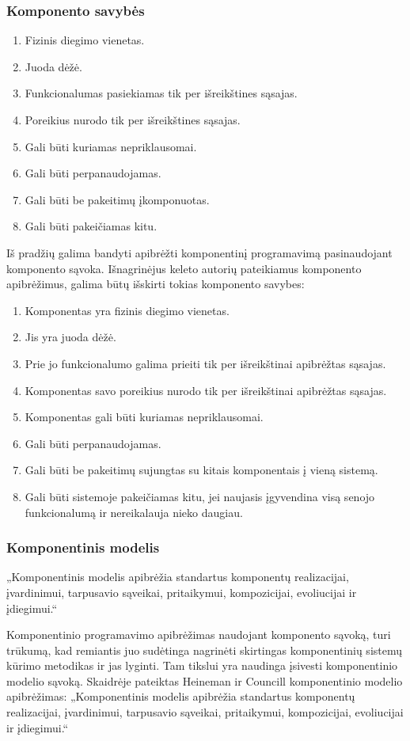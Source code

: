 \begin{frame}
  \frametitle{Komponento savybės}
  \begin{enumerate}
    \item Fizinis diegimo vienetas.
    \item Juoda dėžė.
    \item Funkcionalumas pasiekiamas tik per išreikštines sąsajas.
    \item Poreikius nurodo tik per išreikštines sąsajas.
    \item Gali būti kuriamas nepriklausomai.
    \item Gali būti perpanaudojamas.
    \item Gali būti be pakeitimų įkomponuotas.
    \item Gali būti pakeičiamas kitu.
  \end{enumerate}
  \begin{handout}
    Iš pradžių galima bandyti apibrėžti komponentinį programavimą
    pasinaudojant komponento sąvoka. Išnagrinėjus keleto autorių
    pateikiamus komponento apibrėžimus, galima būtų išskirti tokias
    komponento savybes:
    \begin{enumerate}
      \item Komponentas yra fizinis diegimo vienetas.
      \item Jis yra juoda dėžė.
      \item Prie jo funkcionalumo galima prieiti tik per išreikštinai
        apibrėžtas sąsajas.
      \item Komponentas savo poreikius nurodo tik per išreikštinai
        apibrėžtas sąsajas.
      \item Komponentas gali būti kuriamas nepriklausomai.
      \item Gali būti perpanaudojamas.
      \item Gali būti be pakeitimų sujungtas su kitais komponentais
        į vieną sistemą.
      \item Gali būti sistemoje pakeičiamas kitu, jei naujasis įgyvendina
        visą senojo funkcionalumą ir nereikalauja nieko daugiau.
    \end{enumerate}
  \end{handout}
\end{frame}

\begin{frame}
  \frametitle{Komponentinis modelis}
  „Komponentinis modelis apibrėžia standartus komponentų
  realizacijai, įvardinimui, tarpusavio sąveikai, pritaikymui,
  kompozicijai, evoliucijai ir įdiegimui.“
  \begin{handout}
    Komponentinio programavimo apibrėžimas naudojant komponento
    sąvoką, turi trūkumą, kad remiantis juo sudėtinga nagrinėti
    skirtingas komponentinių sistemų kūrimo metodikas ir jas
    lyginti. Tam tikslui yra naudinga įsivesti komponentinio modelio
    sąvoką. Skaidrėje pateiktas Heineman ir Councill komponentinio
    modelio apibrėžimas:
    „Komponentinis modelis apibrėžia standartus komponentų
    realizacijai, įvardinimui, tarpusavio sąveikai, pritaikymui,
    kompozicijai, evoliucijai ir įdiegimui.“
  \end{handout}
\end{frame}


